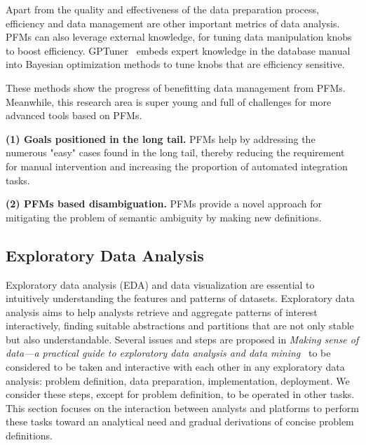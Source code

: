   Apart from the quality and effectiveness of the data preparation process, efficiency and data management are other important metrics of data analysis. PFMs can also leverage external knowledge, for tuning data manipulation knobs to boost efficiency. GPTuner~\cite{GPTuner} embeds expert knowledge in the database manual into Bayesian optimization methods to tune knobs that are efficiency sensitive.
  
  These methods show the progress of benefitting data management from PFMs. Meanwhile, this research area is super young and full of challenges for more advanced tools based on PFMs.
  
  
\begin{takeawaybox}
    
    \textbf{(1) Goals positioned in the long tail.} PFMs help by addressing the numerous "easy" cases found in the long tail, thereby reducing the requirement for manual intervention and increasing the proportion of automated integration tasks.

    \textbf{(2) PFMs based disambiguation.} PFMs provide a novel approach for mitigating the problem of semantic ambiguity by making new definitions.

\end{takeawaybox}

  
  \subsection{Exploratory Data Analysis}\label{sec:explore}
  
  Exploratory data analysis (EDA) and data visualization are essential to intuitively understanding the features and patterns of datasets. Exploratory data analysis aims to help analysts retrieve and aggregate patterns of interest interactively, finding suitable abstractions and partitions that are not only stable but also understandable. Several issues and steps are proposed in \textit{Making sense of data—a practical guide to exploratory data analysis and data mining}~\cite{myatt2007making} to be considered to be taken and interactive with each other in any exploratory data analysis: problem definition, data preparation, implementation, deployment. We consider these steps, except for problem definition, to be operated in other tasks. This section focuses on the interaction between analysts and platforms to perform these tasks toward an analytical need and gradual derivations of concise problem definitions. 
  
